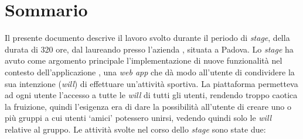 
\cleardoublepage
{}
{}
\begingroup
\let\clearpage\relax
\let\cleardoublepage\relax
\let\cleardoublepage\relax

\chapter*{Sommario}

Il presente documento descrive il lavoro svolto durante il periodo di
\textit{stage},
della durata di 320 ore, dal laureando \myName presso
l'azienda \myCompany, situata a Padova.
Lo \textit{stage} ha avuto come argomento principale l'implementazione di nuove
funzionalità nel contesto dell'applicazione \productName, una
\textit{web app} che dà modo all'utente di condividere la sua intenzione
(\textit{will}) di effettuare un'attività sportiva.
La piattaforma permetteva ad ogni utente l'accesso a tutte le \textit{will} di tutti gli utenti,
rendendo troppo caotica la
fruizione, quindi l'esigenza era di dare la possibilità all'utente
di creare uno o più gruppi a cui utenti \enquote*{amici} potessero unirsi,
vedendo quindi solo le \textit{will} relative al gruppo.
Le attività svolte nel corso dello \textit{stage} sono state due:
